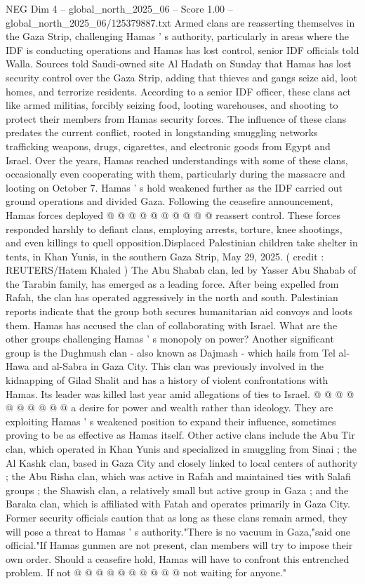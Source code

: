 \begin{textsample}{NEG Dim 4 – global\_north\_2025\_06 – Score 1.00 – global\_north\_2025\_06/125379887.txt}  \label{ex:f4_neg_070}
Armed clans are reasserting themselves in the Gaza Strip, challenging Hamas ' s authority, particularly in areas where the IDF is conducting operations and Hamas has lost control, senior IDF officials told Walla.
Sources told Saudi-owned site Al Hadath on Sunday that Hamas has lost security control over the Gaza Strip, adding that thieves and gangs seize aid, loot homes, and terrorize residents.
According to a senior IDF officer, these clans act like armed militias, forcibly seizing food, looting warehouses, and shooting to protect their members from Hamas security forces.
The influence of these clans predates the current conflict, rooted in longstanding smuggling networks trafficking weapons, drugs, cigarettes, and electronic goods from Egypt and Israel.
Over the years, Hamas reached understandings with some of these clans, occasionally even cooperating with them, particularly during the massacre and looting on October 7.
Hamas ' s hold weakened further as the IDF carried out ground operations and divided Gaza.
Following the ceasefire announcement, Hamas forces deployed @ @ @ @ @ @ @ @ @ @ reassert control.
These forces responded harshly to defiant clans, employing arrests, torture, knee shootings, and even killings to quell opposition.Displaced Palestinian children take shelter in tents, in Khan Yunis, in the southern Gaza Strip, May 29, 2025. ( credit : REUTERS/Hatem Khaled ) The Abu Shabab clan, led by Yasser Abu Shabab of the Tarabin family, has emerged as a leading force.
After being expelled from Rafah, the clan has operated aggressively in the north and south.
Palestinian reports indicate that the group both secures humanitarian aid convoys and loots them.
Hamas has accused the clan of collaborating with Israel.
What are the other groups challenging Hamas ' s monopoly on power?
Another significant group is the Dughmush clan - also known as Dajmash - which hails from Tel al-Hawa and al-Sabra in Gaza City.
This clan was previously involved in the kidnapping of Gilad Shalit and has a history of violent confrontations with Hamas.
Its leader was killed last year amid allegations of ties to Israel. @ @ @ @ @ @ @ @ @ @ a desire for power and wealth rather than ideology.
They are exploiting Hamas ' s weakened position to expand their influence, sometimes proving to be as effective as Hamas itself.
Other active clans include the Abu Tir clan, which operated in Khan Yunis and specialized in smuggling from Sinai ; the Al Kashk clan, based in Gaza City and closely linked to local centers of authority ; the Abu Risha clan, which was active in Rafah and maintained ties with Salafi groups ; the Shawish clan, a relatively small but active group in Gaza ; and the Baraka clan, which is affiliated with Fatah and operates primarily in Gaza City.
Former security officials caution that as long as these clans remain armed, they will pose a threat to Hamas ' s authority."There is no vacuum in Gaza,"said one official."If Hamas gunmen are not present, clan members will try to impose their own order.
Should a ceasefire hold, Hamas will have to confront this entrenched problem.
If not @ @ @ @ @ @ @ @ @ @ not waiting for anyone."

\end{textsample}
